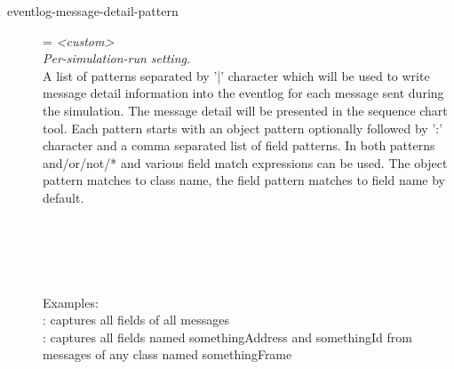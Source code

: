 \begin{description}
\item[eventlog-message-detail-pattern] = \textit{<custom>}\\
    \textit{Per-simulation-run setting.}\\
    A list of patterns separated by '|' character which will be used to write
    message detail information into the eventlog for each message sent during
    the simulation. The message detail will be presented in the sequence chart
    tool. Each pattern starts with an object pattern optionally followed by ':'
    character and a comma separated list of field patterns. In both patterns
    and/or/not/* and various field match expressions can be used. The object
    pattern matches to class name, the field pattern matches to field name by
    default.\\

    \\
        \\
        \\
        \\
        \\
    Examples:\\
        \ttt{*}: captures all fields of all messages\\
        : captures all fields
    named somethingAddress and somethingId from messages of any class named
    somethingFrame\\


\end{description}
